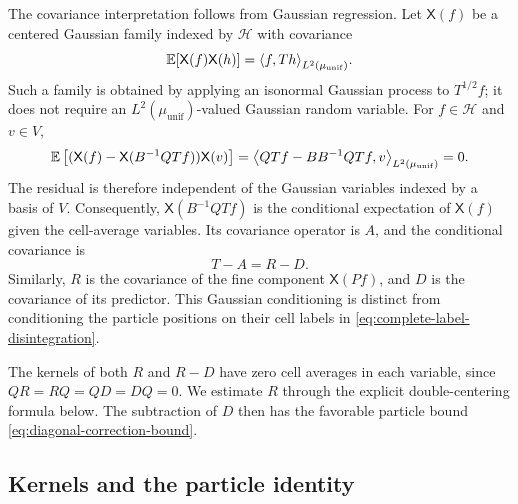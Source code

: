 \documentclass[11pt,reqno]{amsart}
\numberwithin{equation}{section}
\theoremstyle{plain}
\theoremstyle{definition}
\DeclarePairedDelimiter{\ip}{\langle}{\rangle}
\newcommand{\E}{\mathbb E}
\newcommand{\muunif}{\mu_{\mathrm{unif}}}
\begin{document}
The covariance interpretation follows from Gaussian regression. Let $\mathsf X(f)$ be a centered Gaussian family indexed by $\mathcal H$ with covariance
\begin{equation}
 \E[\mathsf X(f)\mathsf X(h)]
 =\ip*{f,Th}_{L^2(\muunif)}.
 \label{eq:generalized-gaussian-field}
\end{equation}
Such a family is obtained by applying an isonormal Gaussian process to $T^{1/2}f$; it does not require an $L^2(\muunif)$-valued Gaussian random variable. For $f\in\mathcal H$ and $v\in V$,
\begin{equation}
 \E\left[(\mathsf X(f)-\mathsf X(B^{-1}QTf))\mathsf X(v)\right]
 =\ip*{QTf-BB^{-1}QTf,v}_{L^2(\muunif)}=0.
 \label{eq:coarse-predictor-orthogonality}
\end{equation}
The residual is therefore independent of the Gaussian variables indexed by a basis of $V$. Consequently, $\mathsf X(B^{-1}QTf)$ is the conditional expectation of $\mathsf X(f)$ given the cell-average variables. Its covariance operator is $A$, and the conditional covariance is
\begin{equation}
 T-A=R-D.
 \label{eq:conditional-covariance}
\end{equation}
Similarly, $R$ is the covariance of the fine component $\mathsf X(Pf)$, and $D$ is the covariance of its predictor. This Gaussian conditioning is distinct from conditioning the particle positions on their cell labels in \eqref{eq:complete-label-disintegration}.

The kernels of both $R$ and $R-D$ have zero cell averages in each variable, since $QR=RQ=QD=DQ=0$. We estimate $R$ through the explicit double-centering formula below. The subtraction of $D$ then has the favorable particle bound \eqref{eq:diagonal-correction-bound}.

\subsection{Kernels and the particle identity}
\label{subsec:kernels-particle-identity}
\end{document}

